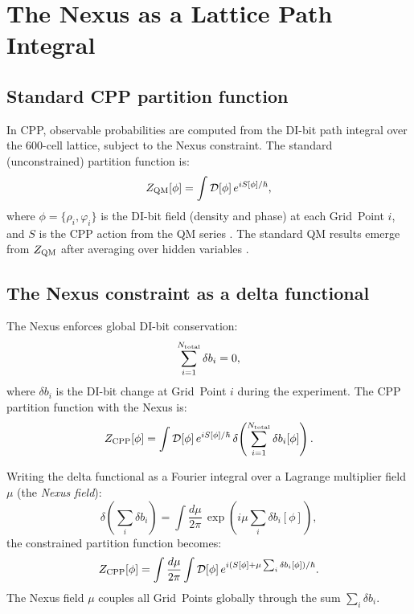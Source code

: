 \documentclass[11pt,letterpaper]{article}
\newcommand{\Ntot}{N_{\rm total}}
\begin{document}
\section{The Nexus as a Lattice Path Integral}
\label{sec:path_integral}

\subsection{Standard CPP partition function}

In CPP, observable probabilities are computed from the DI-bit path
integral over the 600-cell lattice, subject to the Nexus constraint.
The standard (unconstrained) partition function is:
\begin{equation}
Z_{\rm QM}[\phi]
= \int \mathcal{D}[\phi]\,e^{iS[\phi]/\hbar},
\label{eq:Z_QM}
\end{equation}
where $\phi = \{\rho_i, \varphi_i\}$ is the DI-bit field (density
and phase) at each Grid~Point $i$, and $S$ is the CPP action from
the QM series \citep{cpp_qm_series}.  The standard QM results
emerge from $Z_{\rm QM}$ after averaging over hidden variables
\citep{cpp2040c}.

\subsection{The Nexus constraint as a delta functional}

The Nexus enforces global DI-bit conservation:
\begin{equation}
\sum_{i=1}^{\Ntot} \delta b_i = 0,
\label{eq:nexus_constraint}
\end{equation}
where $\delta b_i$ is the DI-bit change at Grid~Point $i$ during
the experiment.  The CPP partition function with the Nexus is:
\begin{equation}
Z_{\rm CPP}[\phi]
= \int \mathcal{D}[\phi]\,e^{iS[\phi]/\hbar}\,
  \delta\!\left(\sum_{i=1}^{\Ntot}\delta b_i[\phi]\right).
\label{eq:Z_CPP}
\end{equation}

Writing the delta functional as a Fourier integral over a
Lagrange multiplier field $\mu$ (the \emph{Nexus field}):
\begin{equation}
\delta\!\left(\sum_i \delta b_i\right)
= \int \frac{d\mu}{2\pi}\,
  \exp\!\left(i\mu\sum_i \delta b_i[\phi]\right),
\label{eq:delta_fourier}
\end{equation}
the constrained partition function becomes:
\begin{equation}
Z_{\rm CPP}[\phi]
= \int \frac{d\mu}{2\pi}
  \int \mathcal{D}[\phi]\,
  e^{i(S[\phi] + \mu\sum_i\delta b_i[\phi])/\hbar}.
\label{eq:Z_CPP_fourier}
\end{equation}
The Nexus field $\mu$ couples all Grid~Points globally through the
sum $\sum_i \delta b_i$.
\end{document}
